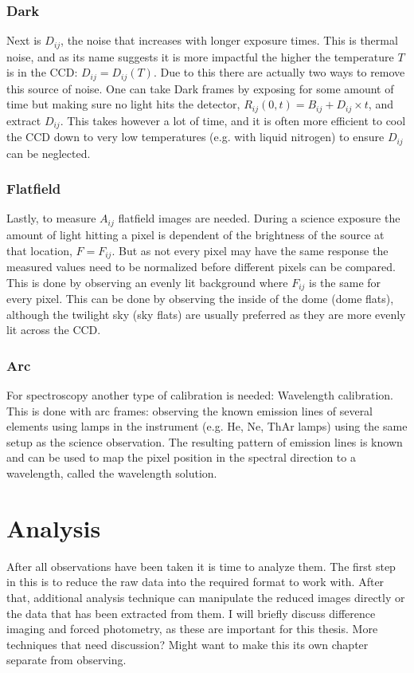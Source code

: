 \documentclass[a4paper,oneside,12pt, class=Latex/Classes/PhDthesisPSnPDF, crop=false]{standalone}
\begin{document}
\subsubsection*{Dark}
Next is $D_{ij}$, the noise that increases with longer exposure times. This is thermal noise, and as its name suggests it is more impactful the higher the temperature $T$ is in the CCD: $D_{ij} = D_{ij}(T)$. Due to this there are actually two ways to remove this source of noise. One can take Dark frames by exposing for some amount of time but making sure no light hits the detector, $R_{ij}(0, t) = B_{ij} + D_{ij} \times t$, and extract $D_{ij}$. This takes however a lot of time, and it is often more efficient to cool the CCD down to very low temperatures (e.g. with liquid nitrogen) to ensure $D_{ij}$ can be neglected.

\subsubsection*{Flatfield}
Lastly, to measure $A_{ij}$ flatfield images are needed. During a science exposure the amount of light hitting a pixel is dependent of the brightness of the source at that location, $F = F_{ij}$. But as not every pixel may have the same response the measured values need to be normalized before different pixels can be compared. This is done by observing an evenly lit background where $F_{ij}$ is the same for every pixel. This can be done by observing the inside of the dome (dome flats), although the twilight sky (sky flats) are usually preferred as they are more evenly lit across the CCD.

\subsubsection*{Arc}
For spectroscopy another type of calibration is needed: Wavelength calibration. This is done with arc frames: observing the known emission lines of several elements using lamps in the instrument (e.g. He, Ne, ThAr lamps) using the same setup as the science observation. The resulting pattern of emission lines is known and can be used to map the pixel position in the spectral direction to a wavelength, called the wavelength solution.


\section{Analysis}
After all observations have been taken it is time to analyze them. The first step in this is to reduce the raw data into the required format to work with. After that, additional analysis technique can manipulate the reduced images directly or the data that has been extracted from them. I will briefly discuss difference imaging and forced photometry, as these are important for this thesis. \color{red} More techniques that need discussion? Might want to make this its own chapter separate from observing.\color{black}
\end{document}
